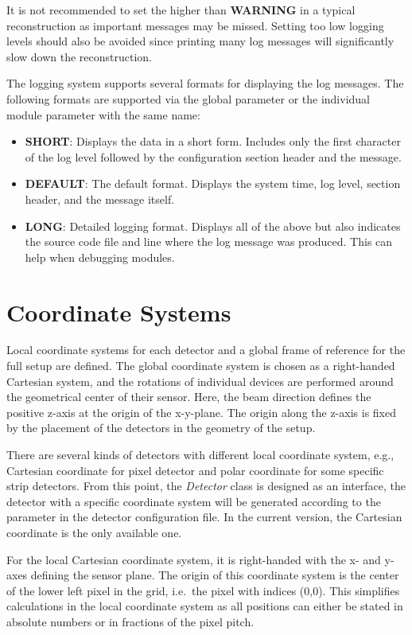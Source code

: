 \begin{warning}
    It is not recommended to set the  higher than \textbf{WARNING} in a typical reconstruction as important messages may be missed.
    Setting too low logging levels should also be avoided since printing many log messages will significantly slow down the reconstruction.
\end{warning}

The logging system supports several formats for displaying the log messages.
The following formats are supported via the global parameter  or the individual module parameter with the same name:
\begin{itemize}
\item \textbf{SHORT}: Displays the data in a short form.
Includes only the first character of the log level followed by the configuration section header and the message.
\item \textbf{DEFAULT}: The default format.
Displays the system time, log level, section header, and the message itself.
\item \textbf{LONG}: Detailed logging format.
Displays all of the above but also indicates the source code file and line where the log message was produced.
This can help when debugging modules.
\end{itemize}

\section{Coordinate Systems}
\label{sec:coordinate_systems}

Local coordinate systems for each detector and a global frame of reference for the full setup are defined.
The global coordinate system is chosen as a right-handed Cartesian system, and the rotations of individual devices are performed around the geometrical center of their sensor.
Here, the beam direction defines the positive z-axis at the origin of the x-y-plane.
The origin along the z-axis is fixed by the placement of the detectors in the geometry of the setup.

There are several kinds of detectors with different local coordinate system, e.g., Cartesian coordinate for pixel detector and polar coordinate for some specific strip detectors. From this point, the \textsl{Detector} class is designed as an interface, the detector with a specific coordinate system will be generated according to the parameter in the detector configuration file. In the current version, the Cartesian coordinate is the only available one. 

For the local Cartesian coordinate system, it is right-handed with the x- and y-axes defining the sensor plane.  The origin of this coordinate system is the center of the lower left pixel in the grid, i.e.\ the pixel with indices (0,0).  This simplifies calculations in the local coordinate system as all positions can either be stated in absolute numbers or in fractions of the pixel pitch.
